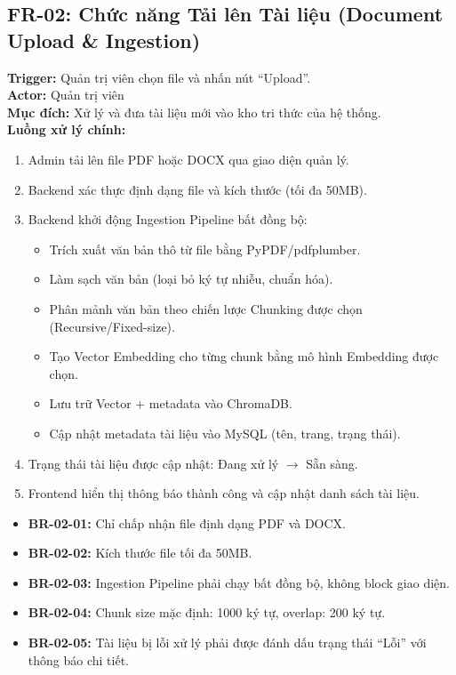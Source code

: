 \subsection{FR-02: Chức năng Tải lên Tài liệu (Document Upload \& Ingestion)}

\begin{funcbox}
  \textbf{Trigger:} Quản trị viên chọn file và nhấn nút ``Upload''.\\[4pt]
  \textbf{Actor:} Quản trị viên\\
  \textbf{Mục đích:} Xử lý và đưa tài liệu mới vào kho tri thức của hệ thống.\\[4pt]
  \textbf{Luồng xử lý chính:}
  \begin{enumerate}[leftmargin=*, itemsep=2pt]
    \item Admin tải lên file PDF hoặc DOCX qua giao diện quản lý.
    \item Backend xác thực định dạng file và kích thước (tối đa 50MB).
    \item Backend khởi động Ingestion Pipeline bất đồng bộ:
      \begin{itemize}
        \item Trích xuất văn bản thô từ file bằng PyPDF/pdfplumber.
        \item Làm sạch văn bản (loại bỏ ký tự nhiễu, chuẩn hóa).
        \item Phân mảnh văn bản theo chiến lược Chunking được chọn (Recursive/Fixed-size).
        \item Tạo Vector Embedding cho từng chunk bằng mô hình Embedding được chọn.
        \item Lưu trữ Vector + metadata vào ChromaDB.
        \item Cập nhật metadata tài liệu vào MySQL (tên, trang, trạng thái).
      \end{itemize}
    \item Trạng thái tài liệu được cập nhật: Đang xử lý $\rightarrow$ Sẵn sàng.
    \item Frontend hiển thị thông báo thành công và cập nhật danh sách tài liệu.
  \end{enumerate}
\end{funcbox}

\begin{rulebox}
  \begin{itemize}[itemsep=2pt]
    \item \textbf{BR-02-01:} Chỉ chấp nhận file định dạng PDF và DOCX.
    \item \textbf{BR-02-02:} Kích thước file tối đa 50MB.
    \item \textbf{BR-02-03:} Ingestion Pipeline phải chạy bất đồng bộ, không block giao diện.
    \item \textbf{BR-02-04:} Chunk size mặc định: 1000 ký tự, overlap: 200 ký tự.
    \item \textbf{BR-02-05:} Tài liệu bị lỗi xử lý phải được đánh dấu trạng thái ``Lỗi'' với thông báo chi tiết.
  \end{itemize}
\end{rulebox}

